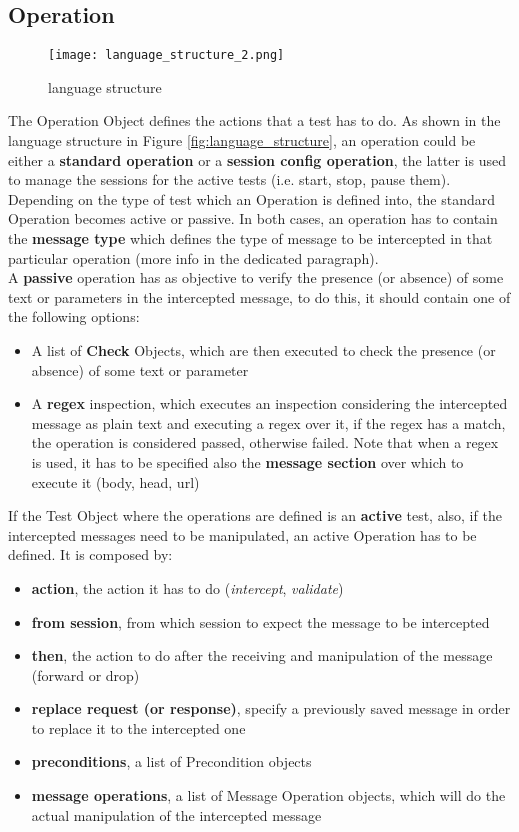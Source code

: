 \subsection{Operation}
\label{sec:operation}
\begin{wrapfigure}{r}{0.4\textwidth}
    \texttt{[image: language\_structure\_2.png]}
    \caption{language structure}
    \label{fig:language_structure_2}
\end{wrapfigure}

The Operation Object defines the actions that a test has to do. As shown in the language structure in Figure \ref{fig:language_structure}, an operation could be either a \textbf{standard operation} or a \textbf{session config operation}, the latter is used to manage the sessions for the active tests (i.e. start, stop, pause them). Depending on the type of test which an Operation is defined into, the standard Operation becomes active or passive.
In both cases, an operation has to contain the \textbf{message type} which defines the type of message to be intercepted in that particular operation (more info in the dedicated paragraph).
\\A \textbf{passive} operation has as objective to verify the presence (or absence) of some text or parameters in the intercepted message, to do this, it should contain one of the following options:
\begin{itemize}
    \item A list of \textbf{Check} Objects, which are then executed to check the presence (or absence) of some text or parameter
    \item A \textbf{regex} inspection, which executes an inspection considering the intercepted message as plain text and executing a regex over it, if the regex has a match, the operation is considered passed, otherwise failed. Note that when a regex is used, it has to be specified also the \textbf{message section} over which to execute it (body, head, url)
\end{itemize}

If the Test Object where the operations are defined is an \textbf{active} test, also, if the intercepted messages need to be manipulated, an active Operation has to be defined. It is composed by:
\begin{itemize}
    \item \textbf{action}, the action it has to do (\textit{intercept}, \textit{validate})
    \item \textbf{from session}, from which session to expect the message to be intercepted
    \item \textbf{then}, the action to do after the receiving and manipulation of the message (forward or drop)
    \item \textbf{replace request (or response)}, specify a previously saved message in order to replace it to the intercepted one
    \item \textbf{preconditions}, a list of Precondition objects
    \item \textbf{message operations}, a list of Message Operation objects, which will do the actual manipulation of the intercepted message
\end{itemize}

